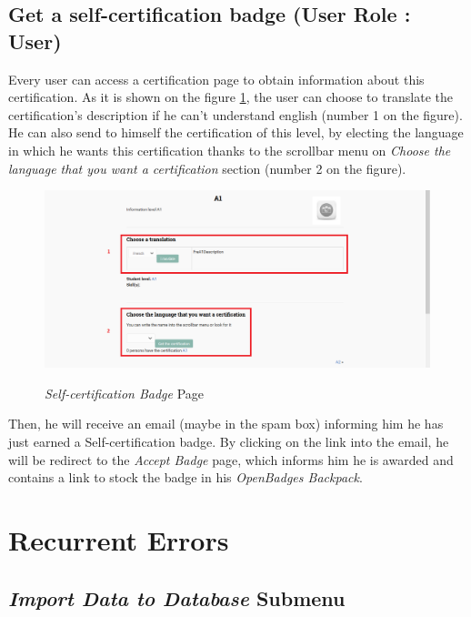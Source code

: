 \documentclass[a4paper, 12pt]{report}
\begin{document}
		
		
		
		
	\newpage
	
		\section{Get a self-certification badge (User Role : User)}
	
	Every user can access a certification page to obtain information about this certification. As it is shown on the figure \ref{selfCertificationPage}, the user can choose to translate the certification's description if he can't understand english (number 1 on the figure). He can also send to himself the certification of this level, by electing the language in which he wants this certification thanks to the scrollbar menu on \textit{Choose the language that you want a certification} section (number 2 on the figure).
	
	\begin{figure}[h]
		\caption{\textit{Self-certification Badge} Page}
		\includegraphics[scale=0.45]{includes/selfCertificationPage}
		\label{selfCertificationPage}
	\end{figure}


	Then, he will receive an email (maybe in the spam box) informing him he has just earned a Self-certification badge. By clicking on the link into the email, he will be redirect to the \textit{Accept Badge} page, which informs him he is awarded and contains a link to stock the badge in his \textit{OpenBadges Backpack}.







	\chapter{Recurrent Errors}
	
		\section{\textit{Import Data to Database} Submenu}
		
\end{document}

